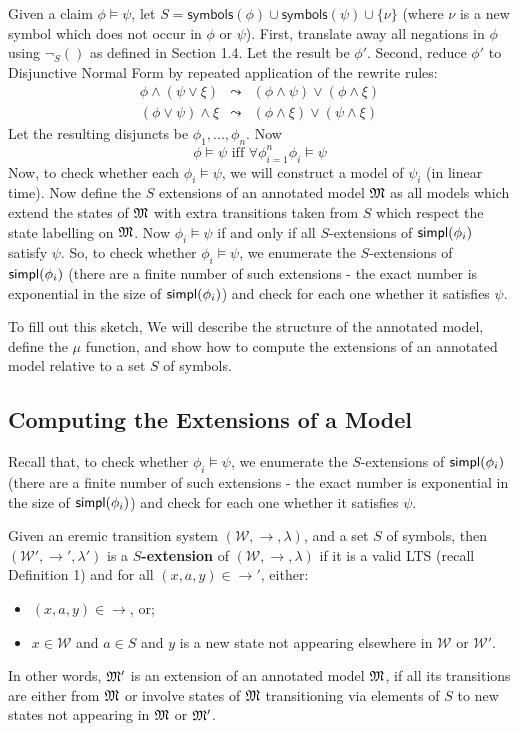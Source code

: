 Given a claim $\phi \models \psi$, let $S = \mathsf{symbols}(\phi) \cup \mathsf{symbols}(\psi) \cup \{\nu\}$ (where $\nu$ is a new symbol which does not occur in $\phi$ or $\psi$).
First, translate away all negations in $\phi$ using $\neg_S()$ as defined in Section 1.4.
Let the result be $\phi'$.
Second, reduce $\phi'$ to Disjunctive Normal Form by repeated application of the rewrite rules:
\begin{eqnarray*}
\phi \land (\psi \lor \xi) & \leadsto & (\phi \land \psi) \lor (\phi \land \xi)  \\
(\phi \lor \psi) \land \xi & \leadsto & (\phi \land \xi) \lor (\psi \land \xi) 
\end{eqnarray*}
Let the resulting disjuncts be $\phi_1, ..., \phi_n$. 
Now 
\[
\phi \models \psi \mbox{ iff } \forall \phi_{i=1}^n \phi_i \models \psi
\]
Now, to check whether each $\phi_i \models \psi$, we will construct a
model of $\psi_i$ (in linear time).  Now define the $S$ extensions of
an annotated model $\frak{M}$ as all models which extend the states of
$\frak{M}$ with extra transitions taken from $S$ which respect the state
labelling on $\frak{M}$.  Now $\phi_i \models \psi$ if and only if all
$S$-extensions of $\mathsf{simpl}(\phi_i)$ satisfy $\psi$.  So, to check
whether $\phi_i \models \psi$, we enumerate the $S$-extensions of
$\mathsf{simpl}(\phi_i)$ (there are a finite number of such extensions - the
exact number is exponential in the size of $\mathsf{simpl}(\phi_i)$) and check
for each one whether it satisfies $\psi$.

To fill out this sketch, We will describe the structure of the
annotated model, define the $\mu$ function, and show how to compute
the extensions of an annotated model relative to a set $S$ of symbols.


\subsection{Computing the Extensions of a Model}

Recall that, to check whether $\phi_i \models \psi$, we enumerate the $S$-extensions of $\mathsf{simpl}(\phi_i)$ (there are a finite number of such extensions - the exact number is exponential in the size of $\mathsf{simpl}(\phi_i)$) and check for each one whether it satisfies $\psi$.

\begin{definition}
Given an eremic transition system $(\mathcal{W},\rightarrow,\lambda)$,  and a set $S$ of symbols, then $(\mathcal{W'},\rightarrow',\lambda')$ is a {\bf $S$-extension} of $(\mathcal{W},\rightarrow,\lambda)$ if it is a valid LTS (recall Definition 1) and for all $(x,a,y) \in \rightarrow'$, either:
\begin{itemize} 
\item
$(x, a, y) \in \rightarrow$,  or;
\item
 $x \in \mathcal{W}$ and $a \in S$ and $y$ is a new state not appearing elsewhere in $\mathcal{W}$ or $\mathcal{W'}$.
\end{itemize}
\end{definition}
In other words, $\frak{M}'$ is an extension of an annotated model $\frak{M}$, if all its transitions are either from $\frak{M}$ or involve states of $\frak{M}$ transitioning via elements of $S$ to new states not appearing in $\frak{M}$ or $\frak{M}'$.


